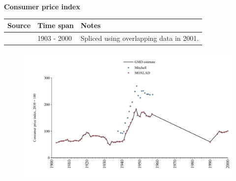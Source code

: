 \documentclass[12pt,a4paper,landscape]{article}
\begin{document}
\begin{adjustbox}{max totalsize={\paperwidth}{\paperheight},center}
\begin{minipage}[t][\textheight][t]{\textwidth}
\vspace*{0.5cm}
{}
\begin{center}
{\Large\bfseries Consumer price index}
\end{center}
\vspace{0.5cm}
\begin{table}[H]
\centering
\small
\begin{tabular}{|l|l|l|}
\hline
\textbf{Source} & \textbf{Time span} & \textbf{Notes} \\
\hline
\rowcolor{white}\cite{MOXLAD}& 1903 - 2000 &Spliced using overlapping data in 2001. \\
\hline
\end{tabular}
\end{table}
\begin{figure}[H]
\centering
\includegraphics[width=\textwidth,height=0.6\textheight,keepaspectratio]{graphs/CUB_CPI.pdf}
\end{figure}
\end{minipage}
\end{adjustbox}
\end{document}
